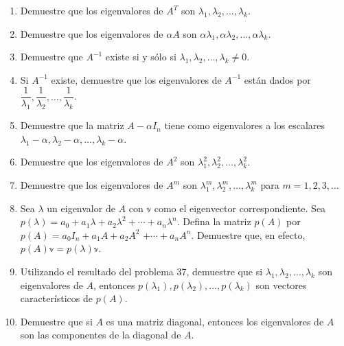 \begin{enumerate}[resume]
    \item Demuestre que los eigenvalores de $A^{T}$ son $\lambda_{1}, \lambda_{2}, \dots, \lambda_{k}$.\newpage
    \item Demuestre que los eigenvalores de $\alpha A$ son $\alpha \lambda_{1}, \alpha \lambda_{2}, \dots, \alpha \lambda_{k}$.
    \item Demuestre que $A^{-1}$ existe si y sólo si $\lambda_{1}, \lambda_{2}, \dots, \lambda_{k} \neq 0$.
    \item Si $A^{-1}$ existe, demuestre que los eigenvalores de $A^{-1}$ están dados por $\dfrac{1}{\lambda_{1}}, \dfrac{1}{\lambda_{2}}, \dots, \dfrac{1}{\lambda_{k}}$.
    \item Demuestre que la matriz $A-\alpha I_n$ tiene como eigenvalores a los escalares $\lambda_{1}-\alpha, \lambda_{2}-\alpha, \dots, \lambda_{k}-\alpha$.
    \item Demuestre que los eigenvalores de $A^{2}$ son $\lambda_{1}^{2}, \lambda_{2}^{2}, \dots, \lambda_{k}^{2}$.
    \item Demuestre que los eigenvalores de $A^{m}$ son $\lambda_{1}^{m}, \lambda_{2}^{m}, \dots, \lambda_{k}^{m}$ para $m=1,2,3, \dots$
    \item Sea $\lambda$ un eigenvalor de $A$ con $\mathbb{v}$ como el eigenvector correspondiente. Sea $p(\lambda)=a_{0}+a_{1} \lambda+a_{2} \lambda^{2}+\cdots+a_{n} \lambda^{n}$. Defina la matriz $p(A)$ por $p(A)=a_{0} I_n+a_{1} A+a_{2} A^{2}$ $+\cdots+a_{n} A^{n}$. Demuestre que, en efecto, $p(A) \mathbb{v}=p(\lambda) \mathbb{v}$.
    \item Utilizando el resultado del problema 37, demuestre que si $\lambda_{1}, \lambda_{2}, \dots, \lambda_{k}$ son eigenvalores de $A$, entonces $p\left(\lambda_{1}\right), p\left(\lambda_{2}\right), \dots, p\left(\lambda_{k}\right)$ son vectores característicos de $p(A)$.
    \item Demuestre que si $A$ es una matriz diagonal, entonces los eigenvalores de $A$ son las componentes de la diagonal de $A$.

\end{enumerate}
